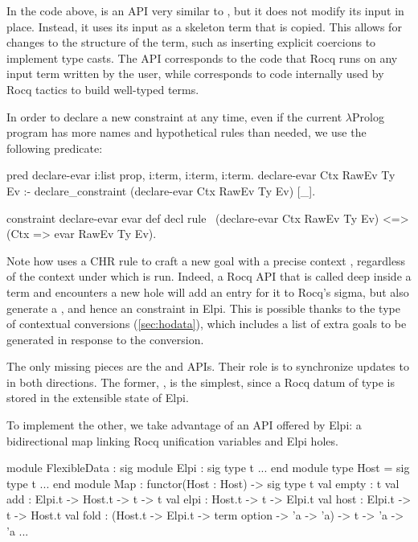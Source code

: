 \documentclass[a4paper, 11pt]{book}
\begin{document}
\noindent
In the code above,  is an API very similar to
, but it does not modify its input in place. Instead, it
uses its input as a skeleton term that is copied. This allows for changes to
the structure of the term, such as inserting explicit coercions to implement
type casts. The API corresponds to the code that Rocq runs on any input term
written by the user, while  corresponds to code
internally used by Rocq tactics to build well-typed terms.

In order to declare a new  constraint at any time, even if the
current $\lambda$Prolog program has more names and hypothetical rules than
needed, we use the following predicate:

\begin{elpicode}
pred declare-evar i:list prop, i:term, i:term, i:term.
declare-evar Ctx RawEv Ty Ev :-
  declare_constraint (declare-evar Ctx RawEv Ty Ev) [_].

constraint declare-evar evar def decl {
  rule \ (declare-evar Ctx RawEv Ty Ev)
     <=> (Ctx => evar RawEv Ty Ev).
}
\end{elpicode}

\noindent
Note how  uses a CHR rule to craft a new goal with a
precise context , regardless of the context under which
 is run. Indeed, a Rocq API that is called deep
inside a term and encounters a new hole will add an entry for it to Rocq's
sigma, but also generate a , and hence an 
constraint in Elpi. This is possible thanks to the type of contextual
conversions (\cref{sec:hodata}), which includes a list of extra goals to be generated in response
to the conversion.

The only missing pieces are the  and 
APIs. Their role is to synchronize updates to  in both
directions. The former, , is the simplest, since a Rocq
datum of type  is stored in the extensible state of Elpi.

To implement the other, we take advantage of an API offered by Elpi: a
bidirectional map linking Rocq unification variables and Elpi holes.

\begin{ocamlcode}
module FlexibleData : sig
  module Elpi : sig type t ... end
  module type Host = sig type t ... end
  module Map : functor(Host : Host) -> sig
    type t
    val empty : t
    val add : Elpi.t -> Host.t -> t -> t
    val elpi   : Host.t -> t -> Elpi.t
    val host : Elpi.t -> t -> Host.t
    val fold :
      (Host.t -> Elpi.t -> term option -> 'a -> 'a) -> t -> 'a -> 'a
    ...
\end{ocamlcode}
\end{document}
